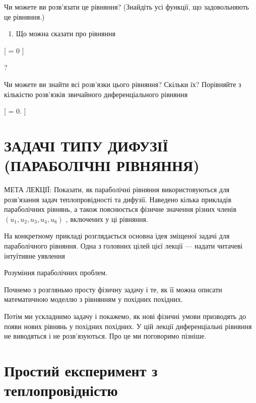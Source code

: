 \documentclass[
  ukrainian,
]{article}
\providecommand{\tightlist}{%
  \setlength{\itemsep}{0pt}\setlength{\parskip}{0pt}}
\begin{document}
Чи можете ви розв'язати це рівняння? (Знайдіть усі функції, що
задовольняють це рівняння.)

\begin{enumerate}
\def\labelenumi{\arabic{enumi}.}
\setcounter{enumi}{4}
\tightlist
\item
  Що можна сказати про рівняння
\end{enumerate}

{[}  = 0 {]}

?

Чи можете ви знайти всі розв'язки цього рівняння? Скільки їх? Порівняйте
з кількістю розв'язків звичайного диференціального рівняння

{[}  = 0. {]}

\section{ЗАДАЧІ ТИПУ ДИФУЗІЇ (ПАРАБОЛІЧНІ
РІВНЯННЯ)}\label{ux437ux430ux434ux430ux447ux456-ux442ux438ux43fux443-ux434ux438ux444ux443ux437ux456ux457-ux43fux430ux440ux430ux431ux43eux43bux456ux447ux43dux456-ux440ux456ux432ux43dux44fux43dux43dux44f}

МЕТА ЛЕКЦІЇ: Показати, як параболічні рівняння використовуються для
розв'язання задач теплопровідності та дифузії. Наведено кілька прикладів
параболічних рівнянь, а також пояснюється фізичне значення різних членів
\((u_1, u_2, u_3, u_4, u_6)\) , включених у ці рівняння.

На конкретному прикладі розглядається основна ідея зміщеної задачі для
параболічного рівняння. Одна з головних цілей цієї лекції --- надати
читачеві інтуїтивне уявлення

Розуміння параболічних проблем.

Почнемо з розгляньмо просту фізичну задачу і те, як її можна описати
математичною моделлю з рівнянням у похідних похідних.

Потім ми ускладнимо задачу і покажемо, як нові фізичні умови призводять
до появи нових рівнянь у похідних похідних. У цій лекції диференціальні
рівняння не виводяться і не розв'язуються. Про це ми поговоримо пізніше.

\section{Простий експеримент з
теплопровідністю}\label{ux43fux440ux43eux441ux442ux438ux439-ux435ux43aux441ux43fux435ux440ux438ux43cux435ux43dux442-ux437-ux442ux435ux43fux43bux43eux43fux440ux43eux432ux456ux434ux43dux456ux441ux442ux44e}
\end{document}
